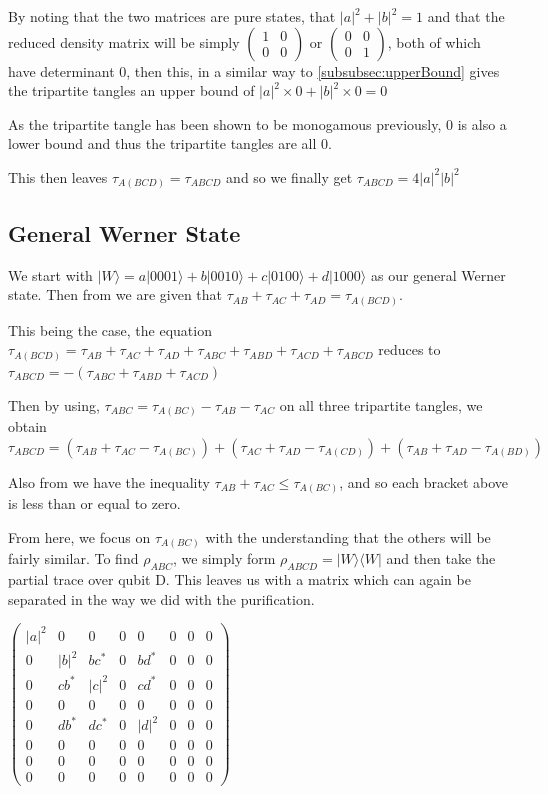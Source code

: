 \documentclass[12pt,a4paper]{article}
\numberwithin{equation}{section}
\begin{document}
By noting that the two matrices are pure states, that $|a|^2 + |b|^2 = 1$ and that the reduced density matrix will be simply $\begin{pmatrix} 1 & 0 \\ 0 & 0 \end{pmatrix}$ or $\begin{pmatrix} 0 & 0 \\ 0 & 1 \end{pmatrix}$, both of which have determinant $0$, then this, in a similar way to \ref{subsubsec:upperBound} gives the tripartite tangles an upper bound of $|a|^2 \times 0 + |b|^2 \times 0 = 0$

As the tripartite tangle has been shown to be monogamous previously, $0$ is also a lower bound and thus the tripartite tangles are all $0$.

This then leaves  $\tau_{A(BCD)} = \tau_{ABCD}$ and so we finally get $\tau_{ABCD} = 4|a|^2|b|^2$


\subsection{General Werner State}
\label{subsec:Werner}

We start with $|W\rangle = a|0001\rangle + b|0010\rangle + c|0100\rangle + d|1000\rangle$ as our general Werner state. Then from \cite{CKW} we are given that $\tau_{AB} + \tau_{AC} + \tau_{AD} = \tau_{A(BCD)}$.

This being the case, the equation $\tau_{A(BCD)} = \tau_{AB} + \tau_{AC} + \tau_{AD} + \tau_{ABC} + \tau_{ABD} + \tau_{ACD} + \tau_{ABCD}$ reduces to $\tau_{ABCD} = -(\tau_{ABC} + \tau_{ABD} + \tau_{ACD})$

Then by using, $\tau_{ABC} = \tau_{A(BC)} - \tau_{AB} - \tau_{AC}$ on all three tripartite tangles, we obtain $\tau_{ABCD} = (\tau_{AB} + \tau_{AC} - \tau_{A(BC)}) + (\tau_{AC} + \tau_{AD} - \tau_{A(CD)}) + (\tau_{AB} + \tau_{AD} - \tau_{A(BD)})$

Also from \cite{CKW} we have the inequality $\tau_{AB} + \tau_{AC} \leq \tau_{A(BC)}$, and so each bracket above is less than or equal to zero.

From here, we focus on $\tau_{A(BC)}$ with the understanding that the others will be fairly similar. To find $\rho_{ABC}$, we simply form $\rho_{ABCD} = |W\rangle\langle W|$ and then take the partial trace over qubit D. This leaves us with a matrix which can again be separated in the way we did with the purification.

$\begin{pmatrix} |a|^2 & 0 & 0 & 0 & 0 & 0 & 0 & 0 \\ 0 & |b|^2 & bc^* & 0 & bd^* & 0 & 0 & 0 \\ 0 & cb^* & |c|^2 & 0 & cd^* & 0 & 0 & 0 \\ 0 & 0 & 0 & 0 & 0 & 0 & 0 & 0 \\ 0 & db^* & dc^* & 0 & |d|^2 & 0 & 0 & 0 \\ 0 & 0 & 0 & 0 & 0 & 0 & 0 & 0 \\ 0 & 0 & 0 & 0 & 0 & 0 & 0 & 0 \\ 0 & 0 & 0 & 0 & 0 & 0 & 0 & 0 \end{pmatrix}$
\end{document}
